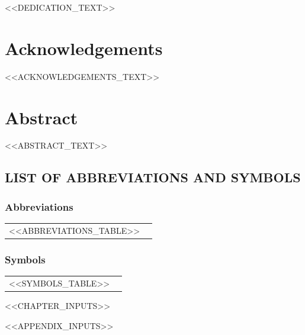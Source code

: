 \documentclass[12pt, a4paper]{report}
\begin{document}
<<DEDICATION_TEXT>>

\newpage

\chapter*{Acknowledgements}

<<ACKNOWLEDGEMENTS_TEXT>>

\newpage

\chapter*{Abstract}
<<ABSTRACT_TEXT>>


\tableofcontents
\listoffigures
\listoftables

\clearpage

\section*{LIST OF ABBREVIATIONS AND SYMBOLS}

\subsection*{Abbreviations}
\begin{tabular}{ll}
<<ABBREVIATIONS_TABLE>>
\end{tabular}

\vspace{1cm}

\subsection*{Symbols}
\begin{tabular}{ll}
<<SYMBOLS_TABLE>>
\end{tabular}

\newpage

\clearpage

<<CHAPTER_INPUTS>>




<<APPENDIX_INPUTS>>
\end{document}
